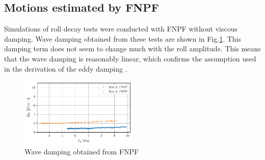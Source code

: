 \subsection*{Motions estimated by FNPF}\label{motions-estimated-by-fnpf}
Simulations of roll decay tests were conducted with FNPF without viscous
damping. Wave damping obtained from these tests are shown in
Fig.\ref{fig:fnpf}. This damping term does not seem to change
much with the roll amplitude. This means that the wave damping is
reasonably linear, which confirms the assumption used in the derivation
of the eddy damping \citep{7505983/4AFVVGNT}.
\begin{figure}[H]
\begin{center}\includegraphics[width = 0.5\textwidth]{figures/fnpf.pdf}\end{center}
\vspace{-1cm}
\caption{Wave damping obtained from FNPF}
\label{fig:fnpf}
\end{figure}
